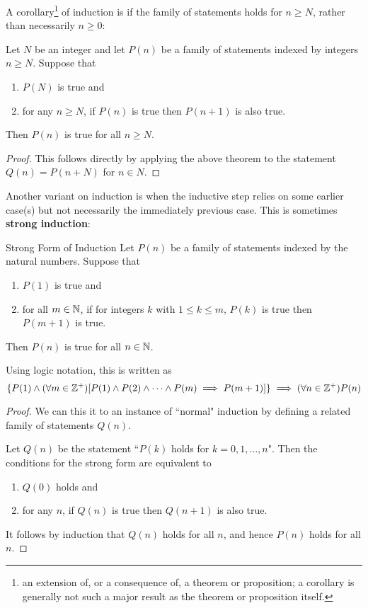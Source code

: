 A corollary\footnote{an extension of, or a consequence of, a theorem or proposition; a corollary is generally not such a major result as the theorem or proposition itself.} of induction is if the family of statements holds for $n \ge N$, rather than necessarily $n \ge 0$:

\begin{corollary}
Let $N$ be an integer and let $P(n)$ be a family of statements indexed by integers $n \ge N$. Suppose that 
\begin{enumerate}[label=(\roman*)]
\item $P(N)$ is true and
\item for any $n \ge N$, if $P(n)$ is true then $P(n+1)$ is also true. 
\end{enumerate}
Then $P(n)$ is true for all $n \ge N$.
\end{corollary}

\begin{proof}
This follows directly by applying the above theorem to the statement $Q(n) = P(n+N)$ for $n \in N$.
\end{proof}

Another variant on induction is when the inductive step relies on some earlier case(s) but not necessarily the immediately previous case. This is sometimes \textbf{strong induction}:

\begin{thrm}{Strong Form of Induction}{}
Let $P(n)$ be a family of statements indexed by the natural numbers. Suppose that
\begin{enumerate}[label=(\roman*)]
\item $P(1)$ is true and
\item for all $m \in \mathbb N$, if for integers $k$ with $1 \le k \le m$, $P(k)$ is true then $P(m+1)$ is true.
\end{enumerate}
Then $P(n)$ is true for all $n \in \mathbb N$.
\end{thrm}

Using logic notation, this is written as
\[ \{P(1) \land (\forall m \in \mathbb Z^+) [P(1) \land P(2) \land \cdots \land P(m) \implies P(m+1)]\} \implies (\forall n \in \mathbb Z^+)P(n) \]

\begin{proof}
We can this it to an instance of ``normal" induction by defining a related family of statements $Q(n)$. 

Let $Q(n)$ be the statement ``$P(k)$ holds for $k=0,1,\dots,n$". Then the conditions for the strong form are equivalent to 
\begin{enumerate}[label=(\roman*)]
\item $Q(0)$ holds and 
\item for any $n$, if $Q(n)$ is true then $Q(n+1)$ is also true.
\end{enumerate}
It follows by induction that $Q(n)$ holds for all $n$, and hence $P(n)$ holds for all $n$.
\end{proof}

